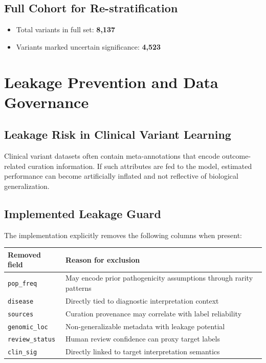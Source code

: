 \documentclass[11pt,a4paper]{article}
\begin{document}
\subsection{Full Cohort for Re-stratification}
\begin{itemize}[leftmargin=1.2cm]
    \item Total variants in full set: \textbf{8,137}
    \item Variants marked uncertain significance: \textbf{4,523}
\end{itemize}

\section{Leakage Prevention and Data Governance}
\subsection{Leakage Risk in Clinical Variant Learning}
Clinical variant datasets often contain meta-annotations that encode outcome-related curation information. If such attributes are fed to the model, estimated performance can become artificially inflated and not reflective of biological generalization.

\subsection{Implemented Leakage Guard}
The implementation explicitly removes the following columns when present:
\begin{center}
\begin{tabular}{ll}
\toprule
\textbf{Removed field} & \textbf{Reason for exclusion} \\
\midrule
\texttt{pop\_freq} & May encode prior pathogenicity assumptions through rarity patterns \\
\texttt{disease} & Directly tied to diagnostic interpretation context \\
\texttt{sources} & Curation provenance may correlate with label reliability \\
\texttt{genomic\_loc} & Non-generalizable metadata with leakage potential \\
\texttt{review\_status} & Human review confidence can proxy target labels \\
\texttt{clin\_sig} & Directly linked to target interpretation semantics \\
\bottomrule
\end{tabular}
\end{center}
\end{document}
